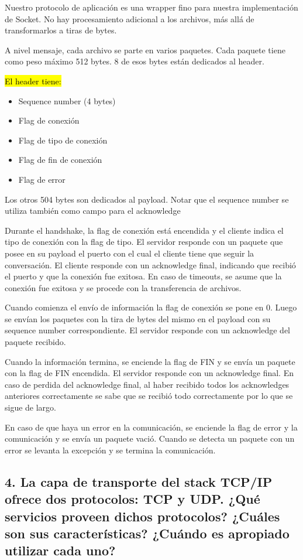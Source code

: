 \documentclass{article}
\begin{document}
Nuestro protocolo de aplicación es una wrapper fino para nuestra implementación de Socket. No hay procesamiento adicional a los archivos, más allá de transformarlos a tiras de bytes.

A nivel mensaje, cada archivo se parte en varios paquetes. Cada paquete tiene como peso máximo 512 bytes. 8 de esos bytes están dedicados al header.

\hl{El header tiene:}

\begin{itemize}
\item
  Sequence number (4 bytes)
\item
  Flag de conexión
\item
  Flag de tipo de conexión
\item
  Flag de fin de conexión
\item
  Flag de error
\end{itemize}

Los otros 504 bytes son dedicados al payload. Notar que el sequence number se utiliza también como campo para el acknowledge

Durante el handshake, la flag de conexión está encendida y el cliente indica el tipo de conexión con la flag de tipo. El servidor responde con un paquete que posee en su payload el puerto con el cual el cliente tiene que seguir la conversación. El cliente responde con un acknowledge final, indicando que recibió el puerto y que la conexión fue exitosa. En caso de timeouts, se asume que la conexión fue exitosa y se procede con la transferencia de archivos.

Cuando comienza el envío de información la flag de conexión se pone en 0. Luego se envían los paquetes con la tira de bytes del mismo en el payload con su sequence number correspondiente. El servidor responde con un acknowledge del paquete recibido. 

Cuando la información termina, se enciende la flag de FIN y se envía un paquete con la flag de FIN encendida. El servidor responde con un acknowledge final. En caso de perdida del acknowledge final, al haber recibido todos los acknowledges anteriores correctamente se sabe que se recibió todo correctamente por lo que se sigue de largo. 

En caso de que haya un error en la comunicación, se enciende la flag de error y la comunicación y se envía un paquete vació. Cuando se detecta un paquete con un error se levanta la excepción y se termina la comunicación.

\subsection{\texorpdfstring{\textbf{4. La capa de transporte del stack TCP/IP ofrece dos protocolos: TCP y UDP. ¿Qué servicios proveen dichos protocolos? ¿Cuáles son sus características? ¿Cuándo es apropiado utilizar cada uno?}}{4. La capa de transporte del stack TCP/IP ofrece dos protocolos: TCP y UDP. ¿Qué servicios proveen dichos protocolos? ¿Cuáles son sus características? ¿Cuándo es apropiado utilizar cada uno?}}\label{la-capa-de-transporte-del-stack-tcpip-ofrece-dos-protocolos-tcp-y-udp.-quuxe9-servicios-proveen-dichos-protocolos-cuuxe1les-son-sus-caracteruxedsticas-cuuxe1ndo-es-apropiado-utilizar-cada-uno}
\end{document}
